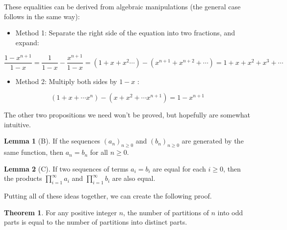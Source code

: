\documentclass{article}
\theoremstyle{definition}
\newtheorem{theorem}{Theorem}
\newtheorem{lemma}{Lemma}
\begin{document}
These equalities can be derived from algebraic manipulations (the general case follows in the same way):

\begin{itemize}
  \item Method 1: Separate the right side of the equation into two fractions, and expand:
\end{itemize}

$$
\frac{1-x^{n+1}}{1-x}=\frac{1}{1-x}-\frac{x^{n+1}}{1-x}=\left(1+x+x^{2} \cdots\right)-\left(x^{n+1}+x^{n+2}+\cdots\right)=1+x+x^{2}+x^{3}+\cdots
$$

\begin{itemize}
  \item Method 2: Multiply both sides by $1-x$ :
\end{itemize}

$$
\left(1+x+\cdots x^{n}\right)-\left(x+x^{2}+\cdots x^{n+1}\right)=1-x^{n+1}
$$

The other two propositions we need won't be proved, but hopefully are somewhat intuitive.\\
\begin{lemma}[B]
If the sequences $\left(a_{n}\right)_{n \geq 0}$ and $\left(b_{n}\right)_{n \geq 0}$ are generated by the same function, then $a_{n}=b_{n}$ for all $n \geq 0$.
\end{lemma}

\begin{lemma}[C]
If two sequences of terms $a_{i}=b_{i}$ are equal for each $i \geq 0$, then the products $\prod_{i=1}^{\infty} a_{i}$ and $\prod_{i=1}^{\infty} b_{i}$ are also equal.
\end{lemma}

Putting all of these ideas together, we can create the following proof.

\begin{theorem}
For any positive integer $n$, the number of partitions of $n$ into odd parts is equal to the number of partitions into distinct parts.
\end{theorem}
\end{document}
